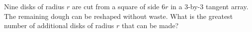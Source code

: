 Nine disks of radius $r$ are cut from a square of side $6r$ in a 3-by-3 tangent array. The remaining dough can be reshaped without waste. What is the greatest number of additional disks of radius $r$ that can be made?

